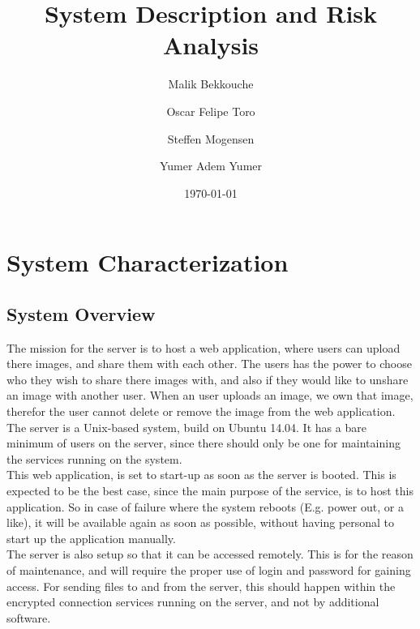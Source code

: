 \documentclass{article}
\title{\huge\sffamily\bfseries System Description and Risk Analysis}
\author{Malik Bekkouche \and Oscar Felipe Toro \and Steffen Mogensen \and  Yumer Adem Yumer}
\date{\today}
\begin{document}
\maketitle


\tableofcontents
\pagebreak


\section{System Characterization}

\subsection{System Overview}
The mission for the server is to host a web application, where users can upload there images, and share them with each other. The users has the power to choose who they wish to share there images with, and also if they would like to unshare an image with another user. When an user uploads an image, we own that image, therefor the user cannot delete or remove the image from the web application. \\

The server is a Unix-based system, build on Ubuntu 14.04. It has a bare minimum of users on the server, since there should only be one for maintaining the services running on the system.\\


This web application, is set to start-up as soon as the server is booted. This is expected to be the best case, since the main purpose of the service, is to host this application. So in case of failure where the system reboots (E.g. power out, or a like), it will be available again as soon as possible, without having personal to start up the application manually.\\

The server is also setup so that it can be accessed remotely. This is for the reason of maintenance, and will require the proper use of login and password for gaining access.
For sending files to and from the server, this should happen within the encrypted connection services running on the server, and not by additional software.
\end{document}
